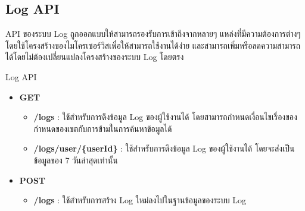 \subsection{Log API}

\ifenglish
\else
API ของระบบ Log ถูกออกแบบให้สามารถรองรับการเข้าถึงจากหลายๆ แหล่งที่มีความต้องการต่างๆ โดยใช้โครงสร้างของไมโครเซอร์วิสเพื่อให้สามารถใช้งานได้ง่าย และสามารถเพิ่มหรือลดความสามารถได้โดยไม่ต้องเปลี่ยนแปลงโครงสร้างของระบบ Log โดยตรง

Log API
\begin{itemize}
    \item \textbf{GET}
    \begin{itemize}
        \item \textbf{/logs} : ใช้สำหรับการดึงข้อมูล Log ของผู้ใช้งานได้ โดยสามารถกำหนดเงื่อนไขเรื่องของกำหนดของเขตกับการข้ามในการค้นหาข้อมูลได้
        \item \textbf{/logs/user/\{userId\}} : ใช้สำหรับการดึงข้อมูล Log ของผู้ใช้งานได้ โดยจะส่งเป็นข้อมูลของ 7 วันล่าสุดเท่านั้น
    \end{itemize}
    \item \textbf{POST}
    \begin{itemize}
        \item \textbf{/logs} : ใช้สำหรับการสร้าง Log ใหม่ลงไปในฐานข้อมูลของระบบ Log
    \end{itemize}
\end{itemize}
\fi